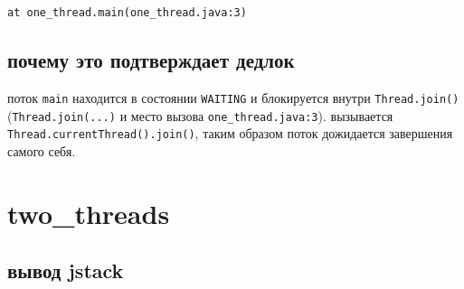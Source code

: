 \documentclass[12pt]{article}
\newcommand{\keyline}[1]{%
  \noindent\colorbox{yellow!25}{\parbox{\dimexpr\linewidth-2\fboxsep\relax}{\texttt{#1}}}%
}
\begin{document}
\keyline{at one\_thread.main(one\_thread.java:3)}

\subsection*{почему это подтверждает дедлок}

поток \texttt{main} находится в состоянии \texttt{WAITING} и блокируется внутри \texttt{Thread.join()}
(\texttt{Thread.join(...)} и место вызова \texttt{one\_thread.java:3}).
вызывается \texttt{Thread.currentThread().join()}, таким образом поток дожидается завершения самого себя.

\newpage

\section{ two\_threads }

\subsection*{вывод jstack}
\end{document}
